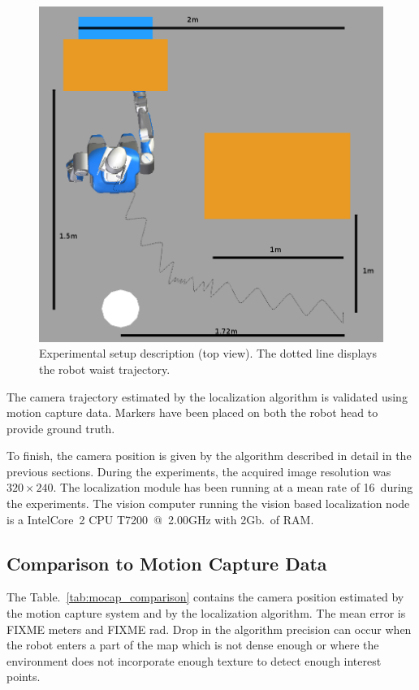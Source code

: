 \begin{figure}[ht!]
  \begin{center}
    \includegraphics[width=\linewidth]{images/dimensions.png}
  \end{center}
  \caption{Experimental setup description (top view). The dotted line
    displays the robot waist trajectory.\label{fig:xp_setup_dim}}
\end{figure}


The camera trajectory estimated by the localization algorithm is
validated using motion capture data. Markers have been placed on both
the robot head to provide ground truth.


To finish, the camera position is given by the algorithm described in
detail in the previous sections. During the experiments, the acquired
image resolution was $320 \times 240$. The localization module has
been running at a mean rate of 16\hertz~during the experiments. The
vision computer running the vision based localization node is a
Intel\textregistered Core\texttrademark\ 2 CPU T7200~@~2.00GHz with
2Gb.\ of RAM.


\subsection{Comparison to Motion Capture Data}\label{sec:mocap}

The Table.~\ref{tab:mocap_comparison} contains the camera position
estimated by the motion capture system and by the localization
algorithm. The mean error is FIXME meters and FIXME rad. Drop in the
algorithm precision can occur when the robot enters a part of the map
which is not dense enough or where the environment does not
incorporate enough texture to detect enough interest points.


